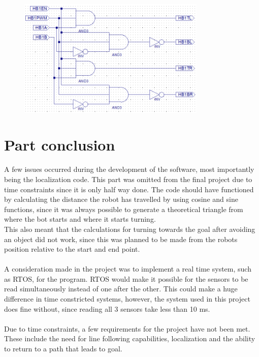 \begin{figure}[!ht]
	\centering
	\includegraphics[width=0.8\textwidth]{figures/cpldlogic.png}
	\caption{}
	\label{hbridgecpldlogic}
\end{figure}
\newpage

\section{Part conclusion}
A few issues occurred during the development of the software, most importantly being the localization code. This part was omitted from the final project due to time constraints since it is only half way done. The code should have functioned by calculating the distance the robot has travelled by using cosine and sine functions, since it was always possible to generate a theoretical triangle from where the bot starts and where it starts turning.\\
This also meant that the calculations for turning towards the goal after avoiding an object did not work, since this was planned to be made from the robots position relative to the start and end point.\\\\
A consideration made in the project was to implement a real time system, such as RTOS, for the program. RTOS would make it possible for the sensors to be read simultaneously instead of one after the other. This could make a huge difference in time constricted systems, however, the system used in this project does fine without, since reading all 3 sensors take less than 10 ms.\\\\
Due to time constraints, a few requirements for the project have not been met. These include the need for line following capabilities, localization and the ability to return to a path that leads to goal.